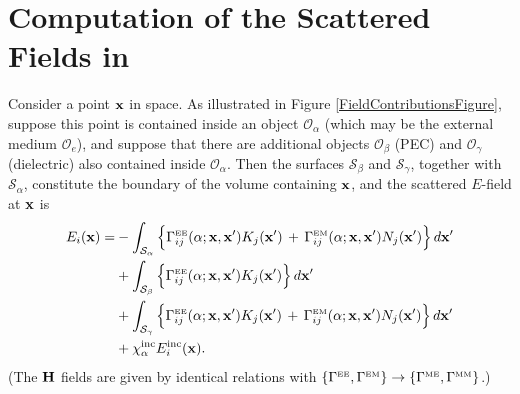 \documentclass[dvips,letterpaper]{article}
\begin{document}
\section{Computation of the Scattered Fields in \ls}

Consider a point $\mathbf{x}$ in space. As illustrated in 
Figure \ref{FieldContributionsFigure}, suppose this point 
is contained inside an object $\mathcal{O}_\alpha$ (which
may be the external medium $\mathcal{O}_e$), and suppose
that there are additional objects 
$\mathcal{O}_\beta$ (PEC) and $\mathcal{O}_\gamma$ (dielectric) 
also contained inside $\mathcal{O}_\alpha$. 
Then the surfaces $\mathcal{S}_\beta$ and $\mathcal{S}_\gamma$,
together with $\mathcal{S}_\alpha$, constitute the boundary of 
the volume containing $\mathbf{x}$, and the scattered $E$-field at 
$\mathbf{x}$ is
\begin{align} 
E_i(\mathbf{x}) 
    = &-\int_{\mathcal{S}_\alpha} 
           \Big\{ \Gamma_{ij}^{\hbox{\tiny{EE}}}(\alpha; \mathbf{x}, \mathbf{x}^\prime) 
                   K_j(\mathbf{x}^\prime)
                  \,+\,
                   \Gamma_{ij}^{\hbox{\tiny{EM}}}(\alpha; \mathbf{x}, \mathbf{x}^\prime) 
                   N_j(\mathbf{x}^\prime)
           \Big\} \, d\mathbf{x}^\prime
\nonumber \\
     &+\int_{\mathcal{S}_\beta} 
           \Big\{ \Gamma_{ij}^{\hbox{\tiny{EE}}}(\alpha; \mathbf{x}, \mathbf{x}^\prime)
                   K_j(\mathbf{x}^\prime)
           \Big\} \, d\mathbf{x}^\prime
\nonumber \\
     &+\int_{\mathcal{S}_\gamma} 
           \Big\{ \Gamma_{ij}^{\hbox{\tiny{EE}}}(\alpha; \mathbf{x}, \mathbf{x}^\prime) 
                   K_j(\mathbf{x}^\prime)
                  \,+\,
                   \Gamma_{ij}^{\hbox{\tiny{EM}}}(\alpha; \mathbf{x}, \mathbf{x}^\prime) 
                   N_j(\mathbf{x}^\prime)
           \Big\} \, d\mathbf{x}^\prime
\nonumber \\
     &+\chi_\alpha^{\hbox{\scriptsize{inc}}} E^{\hbox{\scriptsize{inc}}}_i(\mathbf{x}).
\label{FieldContributionsEquation}
\end{align}
(The $\mathbf{H}$ fields are given by identical relations with 
$\{ \Gamma^{\hbox{\tiny{EE}}}, \Gamma^{\hbox{\tiny{EM}}}\}  \to 
 \{ \Gamma^{\hbox{\tiny{ME}}}, \Gamma^{\hbox{\tiny{MM}}}\}$.) 
\end{document}

